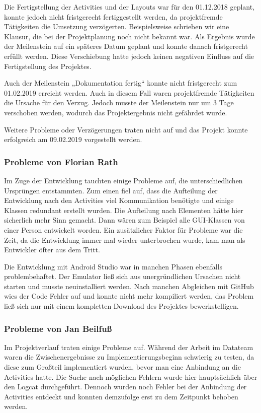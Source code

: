 Die Fertigstellung der Activities und der Layouts war für den 01.12.2018 geplant, konnte jedoch nicht fristgerecht fertiggestellt werden, da projektfremde Tätigkeiten die Umsetzung verzögerten. Beispielsweise schrieben wir eine Klausur, die bei der Projektplanung noch nicht bekannt war. Als Ergebnis wurde der Meilenstein auf ein späteres Datum geplant und konnte danach fristgerecht erfüllt werden. Diese Verschiebung hatte jedoch keinen negativen Einfluss auf die Fertigstellung des Projektes.

Auch der Meilenstein „Dokumentation fertig“ konnte nicht fristgerecht zum 01.02.2019 erreicht werden. Auch in diesem Fall waren projektfremde Tätigkeiten die Ursache für den Verzug. Jedoch musste der Meilenstein nur um 3 Tage verschoben werden, wodurch das Projektergebnis nicht gefährdet wurde.

Weitere Probleme oder Verzögerungen traten nicht auf und das Projekt konnte erfolgreich am 09.02.2019 vorgestellt werden.

\subsubsection{Probleme von Florian Rath}
Im Zuge der Entwicklung tauchten einige Probleme auf, die unterschiedlichen Ursprüngen entstammten. Zum einen fiel auf, dass die Aufteilung der Entwicklung nach den Activities viel Kommunikation benötigte und einige Klassen redundant erstellt wurden. Die Aufteilung nach Elementen hätte hier sicherlich mehr Sinn gemacht. Dann wären zum Beispiel alle GUI-Klassen von einer Person entwickelt worden. Ein zusätzlicher Faktor für Probleme war die Zeit, da die Entwicklung immer mal wieder unterbrochen wurde, kam man als Entwickler öfter aus dem Tritt.

Die Entwicklung mit Android Studio war in manchen Phasen ebenfalls problembehaftet. Der Emulator ließ sich aus unergründlichen Ursachen nicht starten und musste neuinstalliert werden. Nach manchen Abgleichen mit GitHub wies der Code Fehler auf und konnte nicht mehr kompiliert werden, das Problem ließ sich nur mit einem kompletten Download des Projektes bewerkstelligen.

\subsubsection{Probleme von Jan Beilfuß}
Im Projektverlauf traten einige Probleme auf. Während der Arbeit im Datateam waren die Zwischenergebnisse zu Implementierungsbeginn schwierig zu testen, da diese zum Großteil implementiert wurden, bevor man eine Anbindung an die Activities hatte. Die Suche nach möglichen Fehlern wurde hier hauptsächlich über den Logcat durchgeführt. Dennoch wurden noch Fehler bei der Anbindung der Activities entdeckt und konnten demzufolge erst zu dem Zeitpunkt behoben werden.

